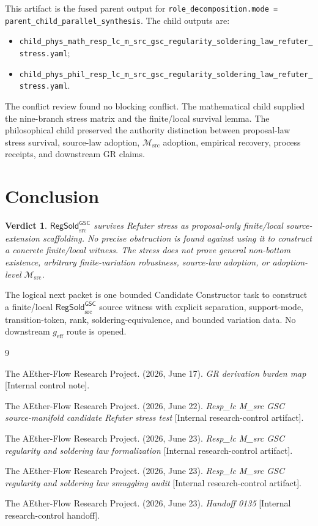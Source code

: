 \documentclass[11pt]{article}
\newcommand{\Msrc}{\mathcal{M}_{\mathrm{src}}}
\newcommand{\geff}{g_{\mathrm{eff}}}
\newcommand{\RegSold}{\mathsf{RegSold}_{\mathrm{src}}^{\mathsf{GSC}}}
\newtheorem{verdict}{Verdict}
\begin{document}
This artifact is the fused parent output for
\texttt{role\_decomposition.mode = parent\_child\_parallel\_synthesis}. The
child outputs are:
\begin{itemize}
  \item \texttt{child\_phys\_math\_resp\_lc\_m\_src\_gsc\_regularity\_soldering\_law\_refuter\_stress.yaml};
  \item \texttt{child\_phys\_phil\_resp\_lc\_m\_src\_gsc\_regularity\_soldering\_law\_refuter\_stress.yaml}.
\end{itemize}
The conflict review found no blocking conflict. The mathematical child
supplied the nine-branch stress matrix and the finite/local survival lemma.
The philosophical child preserved the authority distinction between
proposal-law stress survival, source-law adoption, \(\Msrc\) adoption,
empirical recovery, process receipts, and downstream GR claims.

\section{Conclusion}

\begin{verdict}
\(\RegSold\) survives Refuter stress as proposal-only finite/local
source-extension scaffolding. No precise obstruction is found against using it
to construct a concrete finite/local witness. The stress does not prove
general non-bottom existence, arbitrary finite-variation robustness, source-law
adoption, or adoption-level \(\Msrc\).
\end{verdict}

The logical next packet is one bounded Candidate Constructor task to construct
a finite/local \(\RegSold\) source witness with explicit separation,
support-mode, transition-token, rank, soldering-equivalence, and bounded
variation data. No downstream \(\geff\) route is opened.

\begin{thebibliography}{9}

The AEther-Flow Research Project. (2026, June 17). \emph{GR derivation
burden map} [Internal control note].

The AEther-Flow Research Project. (2026, June 22). \emph{Resp\_lc M\_src
GSC source-manifold candidate Refuter stress test}
[Internal research-control artifact].

The AEther-Flow Research Project. (2026, June 23). \emph{Resp\_lc M\_src
GSC regularity and soldering law formalization}
[Internal research-control artifact].

The AEther-Flow Research Project. (2026, June 23). \emph{Resp\_lc M\_src
GSC regularity and soldering law smuggling audit}
[Internal research-control artifact].

The AEther-Flow Research Project. (2026, June 23). \emph{Handoff 0135}
[Internal research-control handoff].

\end{thebibliography}
\end{document}
